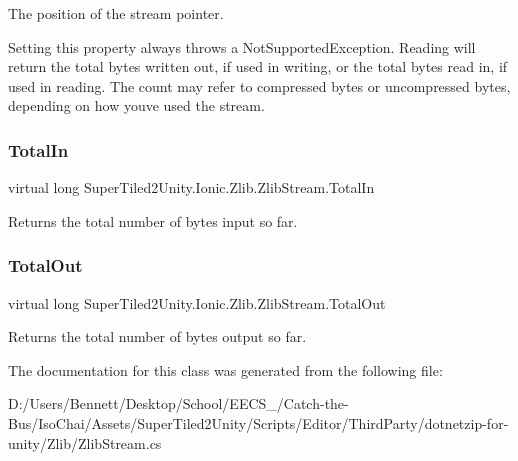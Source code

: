 The position of the stream pointer. 

Setting this property always throws a Not\+Supported\+Exception. Reading will return the total bytes written out, if used in writing, or the total bytes read in, if used in reading. The count may refer to compressed bytes or uncompressed bytes, depending on how you\textquotesingle{}ve used the stream. \mbox{\label{class_super_tiled2_unity_1_1_ionic_1_1_zlib_1_1_zlib_stream_a7860988e77b1d7abe2d6989c0daf3b4b}} 
\subsubsection{\texorpdfstring{Total\+In}{TotalIn}}
{\footnotesize\ttfamily virtual long Super\+Tiled2\+Unity.\+Ionic.\+Zlib.\+Zlib\+Stream.\+Total\+In\hspace{0.3cm}{\ttfamily [get]}}



Returns the total number of bytes input so far.

\mbox{\label{class_super_tiled2_unity_1_1_ionic_1_1_zlib_1_1_zlib_stream_a3f844530eadd82f11009317b8dfc5aa2}} 
\subsubsection{\texorpdfstring{Total\+Out}{TotalOut}}
{\footnotesize\ttfamily virtual long Super\+Tiled2\+Unity.\+Ionic.\+Zlib.\+Zlib\+Stream.\+Total\+Out\hspace{0.3cm}{\ttfamily [get]}}



Returns the total number of bytes output so far.



The documentation for this class was generated from the following file\+:\begin{DoxyCompactItemize}
\item 
D\+:/\+Users/\+Bennett/\+Desktop/\+School/\+E\+E\+C\+S\+\_/\+Catch-\/the-\/\+Bus/\+Iso\+Chai/\+Assets/\+Super\+Tiled2\+Unity/\+Scripts/\+Editor/\+Third\+Party/dotnetzip-\/for-\/unity/\+Zlib/Zlib\+Stream.\+cs\end{DoxyCompactItemize}
